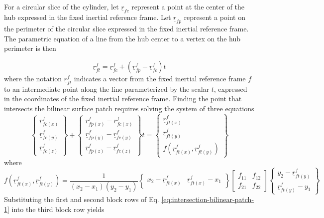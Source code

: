 \documentclass[
10pt, %
a4paper, %
oneside, %
headinclude,footinclude, %
BCOR5mm, %
]{scrartcl}
\begin{document}
For a circular slice of the cylinder, let $\underline{r}_{fc}$ represent a point at the center of the hub expressed in the fixed inertial reference frame. Let $\underline{r}_{fp}$ represent a point on the perimeter of the circular slice expressed in the fixed inertial reference frame. The parametric equation of a line from the hub center to a vertex on the hub perimeter is then

\begin{equation}
  \label{eq:parametric-eqn-line}
\underline{r}_{ft}^f = \underline{r}_{fc}^f + (\underline{r}_{fp}^f - \underline{r}_{fc}^f) t
\end{equation}
where the notation $\underline{r}_{ft}^f$ indicates a vector from the fixed inertial reference frame $f$ to an intermediate point along the line parameterized by the scalar $t$, expressed in the coordinates of the fixed inertial reference frame. Finding the point that intersects the bilinear surface patch requires solving the system of three equations
\begin{equation}
  \label{eq:intersection-bilinear-patch-1}
\begin{Bmatrix}
  \underline{r}_{fc(x)}^f\\
  \underline{r}_{fc(y)}^f\\
  \underline{r}_{fc(z)}^f
\end{Bmatrix} +
\begin{Bmatrix}
  \underline{r}_{fp(x)}^f - \underline{r}_{fc(x)}^f\\
  \underline{r}_{fp(y)}^f - \underline{r}_{fc(y)}^f\\
  \underline{r}_{fp(z)}^f - \underline{r}_{fc(z)}^f
\end{Bmatrix} t =
\begin{Bmatrix}
  \underline{r}_{ft(x)}^f\\
  \underline{r}_{ft(y)}^f\\
  f(\underline{r}_{ft(x)}^f,\underline{r}_{ft(y)}^f)
\end{Bmatrix}
\end{equation}
where
\begin{equation}
  f(\underline{r}_{ft(x)}^f,\underline{r}_{ft(y)}^f) = \frac{1}{( x_2 - x_1) ( y_2 - y_1)} \begin{Bmatrix} x_2 - \underline{r}_{ft(x)}^f & \underline{r}_{ft(x)}^f - x_1 \end{Bmatrix} \begin{bmatrix}f_{11} & f_{12}\\f_{21} & f_{22}\end{bmatrix}\begin{Bmatrix}y_2 - \underline{r}_{ft(y)}^f\\ \underline{r}_{ft(y)}^f - y_1\end{Bmatrix}
\end{equation}
Substituting the first and second block rows of Eq. \eqref{eq:intersection-bilinear-patch-1} into the third block row yields
\end{document}
